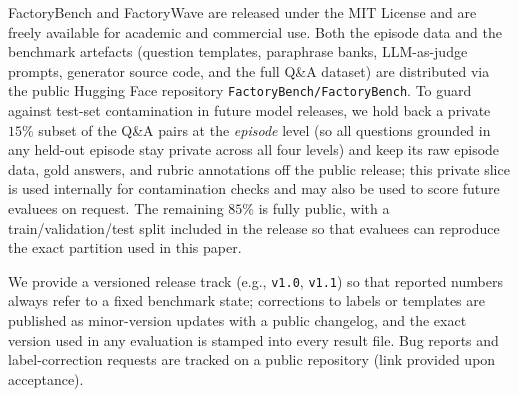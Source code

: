 \documentclass{article}
\begin{document}
FactoryBench and FactoryWave are released under the MIT License and are freely available for academic and commercial use. Both the episode data and the benchmark artefacts (question templates, paraphrase banks, LLM-as-judge prompts, generator source code, and the full Q\&A dataset) are distributed via the public Hugging Face repository \texttt{FactoryBench/FactoryBench}. To guard against test-set contamination in future model releases, we hold back a private $15\%$ subset of the Q\&A pairs at the \emph{episode} level (so all questions grounded in any held-out episode stay private across all four levels) and keep its raw episode data, gold answers, and rubric annotations off the public release; this private slice is used internally for contamination checks and may also be used to score future evaluees on request. The remaining $85\%$ is fully public, with a train/validation/test split included in the release so that evaluees can reproduce the exact partition used in this paper.

We provide a versioned release track (e.g., \texttt{v1.0}, \texttt{v1.1}) so that reported numbers always refer to a fixed benchmark state; corrections to labels or templates are published as minor-version updates with a public changelog, and the exact version used in any evaluation is stamped into every result file. Bug reports and label-correction requests are tracked on a public repository (link provided upon acceptance).


\end{document}

